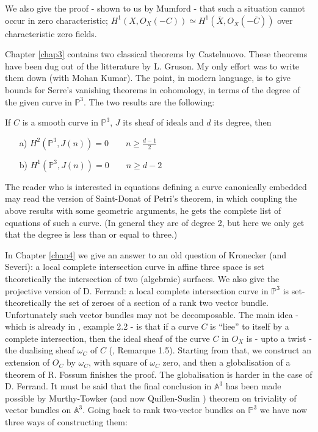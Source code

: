 \begin{itemize}
\begin{itemize}
\begin{itemize}
We also give the proof - shown to us by Mumford - that such a
situation cannot occur in zero characteristic; \ie $H^1(X,
O_X(-C))\simeq H^1(\overline{X}, O_{\overline{X}}(-\overline{C}))$
over characteristic zero fields. 

Chapter \ref{chap3} contains two classical theorems by
Castelnuovo. These theorems have been dug out of the litterature by
L. Gruson. My only effort was to write them down (with Mohan
Kumar). The point, in modern language, is to give bounds for Serre's
vanishing theorems in cohomology, in terms of the degree of the
given curve in $\mathbb{P}^3$. The two results are the following:

If $C$ is a smooth curve in $\mathbb{P}^3$, $J$ its sheaf of ideals
and $d$ its degree, then 
\begin{itemize}
\item [a)] $H^2(\mathbb{P}^3, J(n))=0\qquad n\geq\frac{d-1}{2}$
\item [b)] $H^1(\mathbb{P}^3, J(n))=0\qquad n\geq d-2$
\end{itemize}
\end{itemize}
\end{itemize}
\end{itemize}

The reader who is interested in equations defining a curve canonically
embedded may read the version of Saint-Donat \cite{key14} of Petri's
theorem, in which coupling the above results with some geometric
arguments, he gets the complete list of equations of such a curve. (In
general they are of degree 2, but here we only get that the degree is
less than or equal to three.)

In Chapter \ref{chap4} we give an answer to an old question of
Kronecker (and Severi): a local complete intersection curve in affine
three space is set theoretically the intersection of two (algebraic)
surfaces. We also give the projective version of D. Ferrand: a local
complete intersection curve in $\mathbb{P}^3$ is set-theoretically the
set of zeroes of a section of a rank two vector bundle. Unfortunately
such vector bundles may not be decomposable. The main idea - which is
already in \cite{key11}, example 2.2 - is that if a curve $C$ is
``liee'' to itself by a complete intersection, then the ideal sheaf of
the curve $C$ in $O_X$ is - upto a twist - the dualising sheaf
$\omega_C$ of $C$ (\cite{key11}, Remarque 1.5). Starting from that, we
construct an extension of $O_C$ by $\omega_C$, with square of
$\omega_C$ zero, and then a globalisation of a theorem of
R. Fossum \cite{key3} finishes the proof. The globalisation is harder
in the case of D. Ferrand. It must be said that the final conclusion
in $\mathbb{A}^3$ has been made possible by Murthy-Towker \cite{key9}
(and now Quillen-Suslin \cite{key12}) theorem on triviality of vector
bundles on $\mathbb{A}^3$. Going back to rank two-vector bundles on
$\mathbb{P}^3$ we have now three ways of constructing them:

